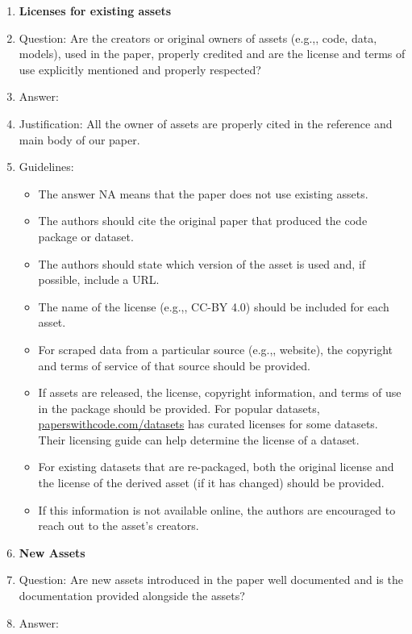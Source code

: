 \documentclass{article}
\theoremstyle{plain}
\theoremstyle{definition}
\theoremstyle{remark}
\begin{document}
\begin{enumerate}
\item {\bf Licenses for existing assets}
    \item[] Question: Are the creators or original owners of assets (e.g.,, code, data, models), used in the paper, properly credited and are the license and terms of use explicitly mentioned and properly respected?
    \item[] Answer: \answerYes{} %
    \item[] Justification: All the owner of assets are properly cited in the reference and main body of our paper.
    \item[] Guidelines:
    \begin{itemize}
        \item The answer NA means that the paper does not use existing assets.
        \item The authors should cite the original paper that produced the code package or dataset.
        \item The authors should state which version of the asset is used and, if possible, include a URL.
        \item The name of the license (e.g.,, CC-BY 4.0) should be included for each asset.
        \item For scraped data from a particular source (e.g.,, website), the copyright and terms of service of that source should be provided.
        \item If assets are released, the license, copyright information, and terms of use in the package should be provided. For popular datasets, \url{paperswithcode.com/datasets} has curated licenses for some datasets. Their licensing guide can help determine the license of a dataset.
        \item For existing datasets that are re-packaged, both the original license and the license of the derived asset (if it has changed) should be provided.
        \item If this information is not available online, the authors are encouraged to reach out to the asset's creators.
    \end{itemize}

\item {\bf New Assets}
    \item[] Question: Are new assets introduced in the paper well documented and is the documentation provided alongside the assets?
    \item[] Answer: \answerNA{} %


\end{enumerate}
\end{document}

